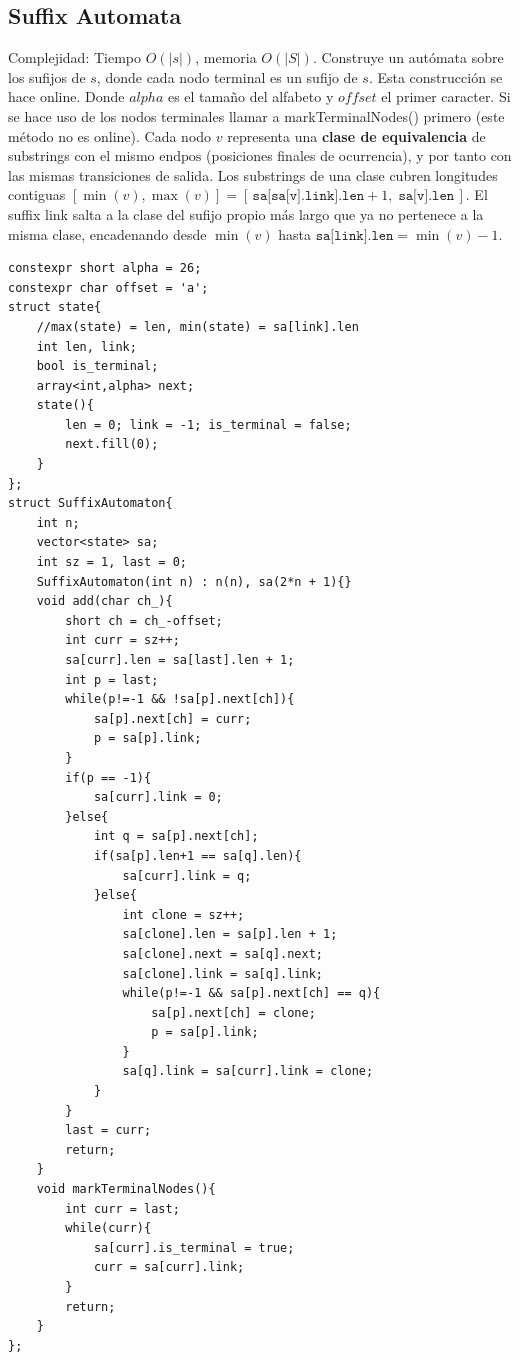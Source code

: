 \subsection{Suffix Automata}
Complejidad: Tiempo $O(|s|)$, memoria $O(|S|)$. Construye un autómata sobre los sufijos de $s$, donde cada nodo terminal es un sufijo de $s$. Esta construcción se hace online. Donde $alpha$ es el tamaño del alfabeto y $offset$ el primer caracter. Si se hace uso de los nodos terminales llamar a markTerminalNodes() primero (este método no es online).
Cada nodo $v$ representa una \textbf{clase de equivalencia} de substrings con el mismo $\mathrm{endpos}$ (posiciones finales de ocurrencia), y por tanto con las mismas transiciones de salida. Los substrings de una clase cubren longitudes contiguas $[\min(v), \max(v)] = [\,\texttt{sa[sa[v].link].len} + 1,\; \texttt{sa[v].len}\,]$. El suffix link salta a la clase del sufijo propio más largo que ya no pertenece a la misma clase, encadenando desde $\min(v)$ hasta $\texttt{sa[link].len} = \min(v)-1$.
\begin{verbatim}
constexpr short alpha = 26;
constexpr char offset = 'a';
struct state{
    //max(state) = len, min(state) = sa[link].len
    int len, link;
    bool is_terminal;
    array<int,alpha> next;
    state(){
        len = 0; link = -1; is_terminal = false;
        next.fill(0);
    }
};
struct SuffixAutomaton{
    int n;
    vector<state> sa;
    int sz = 1, last = 0;
    SuffixAutomaton(int n) : n(n), sa(2*n + 1){}
    void add(char ch_){
        short ch = ch_-offset;
        int curr = sz++;
        sa[curr].len = sa[last].len + 1;
        int p = last;
        while(p!=-1 && !sa[p].next[ch]){
            sa[p].next[ch] = curr;
            p = sa[p].link;
        }
        if(p == -1){
            sa[curr].link = 0;
        }else{
            int q = sa[p].next[ch];
            if(sa[p].len+1 == sa[q].len){
                sa[curr].link = q;
            }else{
                int clone = sz++;
                sa[clone].len = sa[p].len + 1;
                sa[clone].next = sa[q].next;
                sa[clone].link = sa[q].link;
                while(p!=-1 && sa[p].next[ch] == q){
                    sa[p].next[ch] = clone;
                    p = sa[p].link;
                }
                sa[q].link = sa[curr].link = clone;
            }
        }
        last = curr;
        return;
    }
    void markTerminalNodes(){
        int curr = last;
        while(curr){
            sa[curr].is_terminal = true;
            curr = sa[curr].link;
        }
        return;
    }
};
\end{verbatim}



